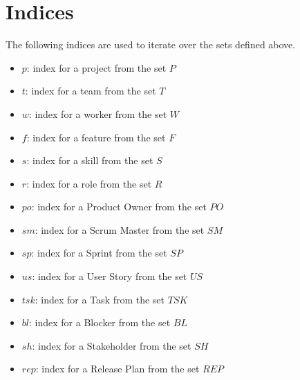 \documentclass{article}
\begin{document}
\section{Indices}
The following indices are used to iterate over the sets defined above.
\begin{itemize}
    \item $p$: index for a project from the set $P$
    \item $t$: index for a team from the set $T$
    \item $w$: index for a worker from the set $W$
    \item $f$: index for a feature from the set $F$
    \item $s$: index for a skill from the set $S$
    \item $r$: index for a role from the set $R$
    \item $po$: index for a Product Owner from the set $PO$
    \item $sm$: index for a Scrum Master from the set $SM$
    \item $sp$: index for a Sprint from the set $SP$
    \item $us$: index for a User Story from the set $US$
    \item $tsk$: index for a Task from the set $TSK$
    \item $bl$: index for a Blocker from the set $BL$
    \item $sh$: index for a Stakeholder from the set $SH$
    \item $rep$: index for a Release Plan from the set $REP$
\end{itemize}
\end{document}

